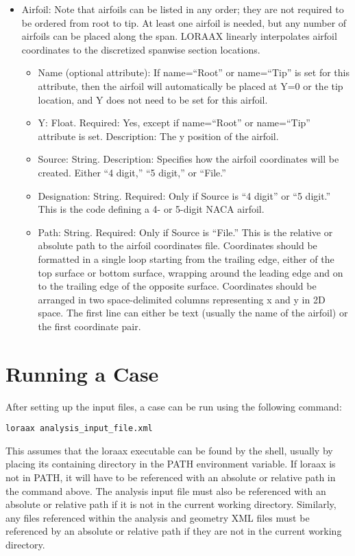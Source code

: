 \documentclass[11pt]{article}
\begin{document}
\begin{itemize}
	\item Airfoil: Note that airfoils can be listed in any order; they are not
		required to be ordered from root to tip. At least one airfoil is
		needed, but any number of airfoils can be placed along the span.
		LORAAX linearly interpolates airfoil coordinates to the discretized
		spanwise section locations.
	\begin{itemize}
		\item Name (optional attribute): If name=``Root'' or name=``Tip'' is set for
			this attribute, then the airfoil will automatically be placed at
			Y=0 or the tip location, and Y does not need to be set for this
			airfoil.
		\item Y: Float. Required: Yes, except if name=``Root'' or name=``Tip''
			attribute is set. Description: The y position of the airfoil.
		\item Source: String. Description: Specifies how the airfoil coordinates
			will be created. Either ``4 digit,'' ``5 digit,'' or ``File.'' 
		\item Designation: String. Required: Only if Source is ``4 digit'' or
			``5 digit.'' This is the code defining a 4- or 5-digit NACA airfoil.
		\item Path: String. Required: Only if Source is ``File.'' This is the
			relative or absolute path to the airfoil coordinates file.
			Coordinates should be formatted in a single loop starting from the
			trailing edge, either of the top surface or bottom surface, wrapping
			around the leading edge and on to the trailing edge of the opposite
			surface. Coordinates should be arranged in two space-delimited
			columns representing
			x and y in 2D space. The first line can either be text (usually the
			name of the airfoil) or the first coordinate pair.
	\end{itemize}
\end{itemize}

\section{Running a Case}

After setting up the input files, a case can be run using the following
command:

\begin{verbatim}
loraax analysis_input_file.xml
\end{verbatim}

\noindent This assumes that the loraax executable can be found by the shell,
usually by placing its containing directory in the PATH environment variable. If
loraax is not in PATH, it will have to be referenced with an absolute or
relative path in the command above. The analysis input file must also be
referenced with an absolute or relative path if it is not in the current working
directory. Similarly, any files referenced within the analysis and geometry XML
files must be referenced by an absolute or relative path if they are not in the
current working directory.
\end{document}
